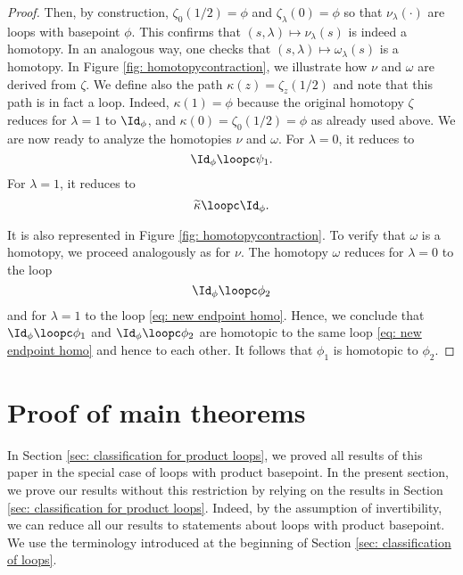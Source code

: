 \begin{proof}
	Then, by construction,  $\zeta_0(1/2)=\phi$ and $\zeta_{\lambda}(0)=\phi$ so that $\nu_\lambda(\cdot)$ are loops with basepoint $\phi$. This confirms that  $(s,\lambda)\mapsto \nu_\lambda(s)$ is indeed a homotopy.  In an analogous way, one checks that  $(s,\lambda)\mapsto \omega_\lambda(s)$ is a homotopy.   In Figure \ref{fig: homotopycontraction}, we illustrate how $\nu$ and $\omega$ are derived from $\zeta$.
	We define also the path $\kappa(z)=\zeta_{z}(1/2)$ and note that this path is in fact a loop. Indeed, $\kappa(1)=\phi$ because the original homotopy $\zeta$ reduces for $\lambda=1$ to  $\Id_\phi$, and $\kappa(0)=\zeta_0(1/2)=\phi$ as already used above. 
	We are now ready to analyze the homotopies $\nu$ and $\omega$. 
	For $\lambda=0$, it reduces to
	$$
	\Id_{\phi}\loopc\psi_1.
	$$
	For $\lambda=1$, it reduces to 
	\begin{equation}\label{eq: new endpoint homo}
		\widetilde\kappa\loopc \Id_{\phi}.
	\end{equation}
	
	It is also represented in Figure \ref{fig: homotopycontraction}. To verify that $\omega$ is a homotopy, we proceed analogously as for $\nu$.
	The homotopy $\omega$ reduces for $\lambda=0$ to the loop 
	$$
	\Id_{\phi}\loopc\phi_2
	$$
	and for $\lambda=1$ to the loop \eqref{eq: new endpoint homo}.
	Hence, we conclude that $
	\Id_{\phi}\loopc\phi_1 
	$ and $
	\Id_{\phi}\loopc\phi_2 
	$
	are homotopic to the same loop \eqref{eq: new endpoint homo} and hence to each other. It follows that $\phi_1$ is  homotopic to $\phi_2$.
\end{proof}

\section{Proof of main theorems}\label{sec: proofs of main}

In Section \ref{sec: classification for product loops}, we proved all results of this paper in the special case of loops with product basepoint.  In the present section, we prove our results without this restriction by relying on the results in Section \ref{sec: classification for product loops}. Indeed, by the assumption of invertibility, we can reduce all our results to statements about loops with product basepoint. We use the terminology introduced at the beginning of Section \ref{sec: classification of loops}.

